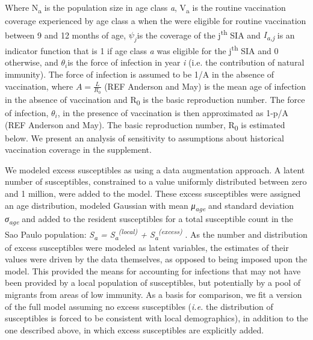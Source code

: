 
Where N\textsubscript{a} is the population size in age class \emph{a},
V\textsubscript{a} is the routine vaccination coverage experienced by
age class a when the were eligible for routine vaccination between 9 and
12 months of age, \(\psi_{j}\)is the coverage of the
j\textsuperscript{th} SIA and \emph{I\textsubscript{a,j}} is an
indicator function that is 1 if age class \emph{a} was eligible for the
j\textsuperscript{th} SIA and 0 otherwise, and \(\theta_{i}\)is the
force of infection in year \emph{i} (i.e. the contribution of natural
immunity). The force of infection is assumed to be 1/A in the absence of
vaccination, where \(A = \frac{L}{R_{0}}\) (REF Anderson and May) is the
mean age of infection in the absence of vaccination and
R\textsubscript{0} is the basic reproduction number. The force of
infection, \(\theta_{i}\), in the presence of vaccination is then
approximated as 1-p/A (REF Anderson and May). The basic reproduction
number, R\textsubscript{0} is estimated below. We present an analysis of
sensitivity to assumptions about historical vaccination coverage in the
supplement.

We modeled excess susceptibles as using a data augmentation approach. A
latent number of susceptibles, constrained to a value uniformly
distributed between zero and 1 million, were added to the model. These
excess susceptibles were assigned an age distribution, modeled Gaussian
with mean \emph{μ\textsubscript{age}} and standard deviation
\emph{σ\textsubscript{age}} and added to the resident susceptibles for a
total susceptible count in the Sao Paulo population:
\emph{S\textsubscript{a} = S\textsubscript{a}\textsuperscript{(local)} +
S\textsubscript{a}\textsuperscript{(excess)}} . As the number and
distribution of excess susceptibles were modeled as latent variables,
the estimates of their values were driven by the data themselves, as
opposed to being imposed upon the model. This provided the means for
accounting for infections that may not have been provided by a local
population of susceptibles, but potentially by a pool of migrants from
areas of low immunity. As a basis for comparison, we fit a version of
the full model assuming no excess susceptibles (\emph{i.e.} the
distribution of susceptibles is forced to be consistent with local
demographics), in addition to the one described above, in which excess
susceptibles are explicitly added.

